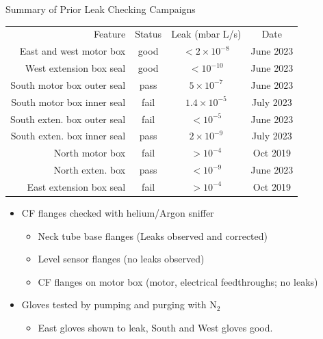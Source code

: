 \documentclass{beamer}
\begin{document}
\begin{frame}{Summary of Prior Leak Checking Campaigns}
	\begin{table}
	\begin{tabular}{r|c|c|c}
	Feature & Status & Leak (mbar L/s)& Date\\
	East and west motor box & good & $< 2\times10^{-8}$ & June 2023 \\
	West extension box seal & good & $< 10^{-10}$ & June 2023 \\
	South motor box outer seal & pass & $5\times10^{-7}$ & June 2023 \\
	South motor box inner seal & fail &  $1.4\times10^{-5}$ & July 2023 \\
	South exten. box outer seal & fail &  $< 10^{-5}$ & June 2023 \\
	South exten. box inner seal & pass &  $2\times10^{-9}$ & July 2023 \\
	North motor box & fail &  $ > 10^{-4}$ & Oct 2019 \\
	North exten. box & pass&  $ < 10^{-9}$ & June 2023 \\
	East extension box seal & fail & $ > 10^{-4}$ & Oct 2019 \\
	\end{tabular}
	\end{table}
	\begin{itemize}
	\item CF flanges checked with helium/Argon sniffer
		\begin{itemize}
		\item Neck tube base flanges (Leaks observed and corrected)
		\item Level sensor flanges (no leaks observed)
		\item CF flanges on motor box (motor, electrical feedthroughs; no leaks)
		\end{itemize}
	\item Gloves tested by pumping and purging with N$_{2}$
		\begin{itemize}
		\item East gloves shown to leak, South and West gloves good.
		\end{itemize}
	\end{itemize}
\end{frame}
\end{document}
